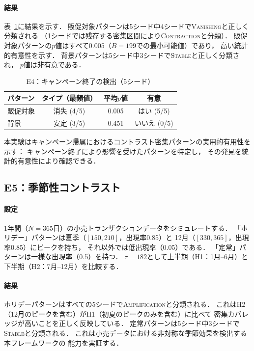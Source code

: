 \paragraph{結果}
表~\ref{tab:e4}に結果を示す．
販促対象パターンは5シード中4シードで\textsc{Vanishing}と正しく分類される
（1シードでは残存する密集区間により\textsc{Contraction}と分類）．
販促対象パターンの$p$値はすべて0.005（$B = 199$での最小可能値）であり，
高い統計的有意性を示す．
背景パターンは5シード中3シードで\textsc{Stable}と正しく分類され，
$p$値は非有意である．

\begin{table}[t]
\centering
\caption{E4：キャンペーン終了の検出（5シード）}
\label{tab:e4}
\begin{tabular}{lccc}
\toprule
パターン & タイプ（最頻値） & 平均$p$値 & 有意 \\
\midrule
販促対象 & 消失 (4/5) & 0.005 & はい (5/5) \\
背景     & 安定 (3/5) & 0.451 & いいえ (0/5) \\
\bottomrule
\end{tabular}
\end{table}

本実験はキャンペーン帰属におけるコントラスト密集パターンの実用的有用性を示す：
キャンペーン終了により影響を受けたパターンを特定し，
その発見を統計的有意性により確認できる．

\subsection{E5：季節性コントラスト}

\paragraph{設定}
1年間（$N = 365$日）の小売トランザクションデータをシミュレートする．
「ホリデー」パターンは夏季（$[150, 210]$，出現率0.85）と
12月（$[330, 365]$，出現率0.85）にピークを持ち，
それ以外では低出現率（0.05）である．
「定常」パターンは一様な出現率（0.5）を持つ．
$\tau = 182$として上半期（H1：1月--6月）と下半期（H2：7月--12月）を比較する．

\paragraph{結果}
ホリデーパターンはすべての5シードで\textsc{Amplification}と分類される．
これはH2（12月のピークを含む）がH1（初夏のピークのみを含む）に比べて
密集カバレッジが高いことを正しく反映している．
定常パターンは5シード中3シードで\textsc{Stable}と分類される．
これは小売データにおける非対称な季節効果を検出する本フレームワークの
能力を実証する．

